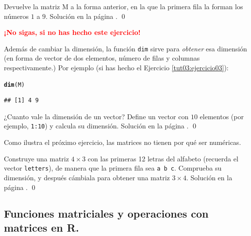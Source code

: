 \documentclass[10pt,a4paper]{article}\usepackage[]{graphicx}\usepackage[]{color}
\makeatletter
\newcommand{\hlstd}[1]{\textcolor[rgb]{0.345,0.345,0.345}{#1}}%
\newcommand{\hlkwd}[1]{\textcolor[rgb]{0.737,0.353,0.396}{\textbf{#1}}}%
\newenvironment{kframe}{%
 \def\at@end@of@kframe{}%
 \ifinner\ifhmode%
  \def\at@end@of@kframe{\end{minipage}}%
  \begin{minipage}{\columnwidth}%
 \fi\fi%
 \def\FrameCommand##1{\hskip\@totalleftmargin \hskip-\fboxsep
 \colorbox{shadecolor}{##1}\hskip-\fboxsep
     \hskip-\linewidth \hskip-\@totalleftmargin \hskip\columnwidth}%
 \MakeFramed {\advance\hsize-\width
   \@totalleftmargin\z@ \linewidth\hsize
   \@setminipage}}%
 {\par\unskip\endMakeFramed%
 \at@end@of@kframe}
\newenvironment{knitrout}{}{} %
\makeatother
\begin{document}
\begin{ejercicio}
\label{tut03:ejercicio04}
\quad
Devuelve la matriz M a la forma anterior, en la que la primera fila la forman los números $1$ a $9$. Solución en la página \pageref{tut03:ejercicio04:sol}.
\qed
\end{ejercicio}

\vspace{1cm}
\begin{center}
\textcolor{red}{\Large\bf  ¡No sigas, si no has hecho este ejercicio!}
\end{center}

Además de cambiar la dimensión, la función {\tt dim} sirve para {\em obtener} esa dimensión (en forma de vector de dos elementos, número de filas y columnas respectivamente.) Por ejemplo (si has hecho el Ejercicio \ref{tut03:ejercicio03}):
\begin{knitrout}
\color{fgcolor}\begin{kframe}
\begin{alltt}
    \hlkwd{dim}\hlstd{(M)}
\end{alltt}
\begin{verbatim}
## [1] 4 9
\end{verbatim}
\end{kframe}
\end{knitrout}

\begin{ejercicio}
\label{tut03:ejercicio05}
\quad
¿Cuanto vale la dimensión de un vector? Define un vector con $10$ elementos (por ejemplo, {\tt 1:10}) y calcula su dimensión.
Solución en la página \pageref{tut03:ejercicio05:sol}.
\qed
\end{ejercicio}

Como ilustra el próximo ejercicio, las matrices no tienen por qué ser numéricas.
\begin{ejercicio}
\label{tut03:ejercicio06}
\quad
Construye una matriz $4\times 3$ con las primeras 12 letras del alfabeto (recuerda el vector {\tt letters}), de manera que la primera fila sea {\tt a b c}. Comprueba su dimensión, y después cámbiala para obtener una matriz $3\times 4$.
Solución en la página \pageref{tut03:ejercicio06:sol}.
\qed
\end{ejercicio}


\subsection{Funciones matriciales y operaciones con matrices en R.}
\label{tut03:subsec:FuncionesMatricialesR}
\end{document}
